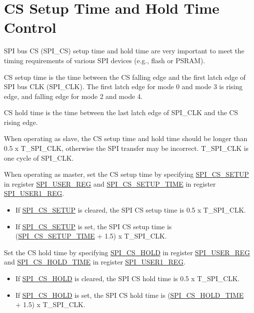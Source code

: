 \documentclass[main\_\_EN.tex]{subfiles}
\begin{document}
\section{CS Setup Time and Hold Time Control}\label{sec:gp-spi2-cs-timing}

SPI bus CS (SPI\_CS) setup time and hold time are very important to meet the timing requirements of various SPI devices (e.g., flash or PSRAM).

CS setup time is the time between the CS falling edge and the first latch edge of SPI bus CLK (SPI\_CLK). The first latch edge for mode 0 and mode 3 is rising edge, and falling edge for mode 2 and mode 4.

CS hold time is the time between the last latch edge of SPI\_CLK and the CS rising edge.

When operating as slave, the CS setup time and hold time should be longer than 0.5 x T\_SPI\_CLK, otherwise the SPI transfer may be incorrect. T\_SPI\_CLK is one cycle of SPI\_CLK.

When operating as master, set the CS setup time by specifying \hyperref[fielddesc:SPICSSETUP]{SPI\_CS\_SETUP} in register \hyperref[regdesc:SPIUSERREG]{SPI\_USER\_REG} and \hyperref[fielddesc:SPICSSETUPTIME]{SPI\_CS\_SETUP\_TIME} in register \hyperref[regdesc:SPIUSER1REG]{SPI\_USER1\_REG}.
    \begin{itemize}
        \item If \hyperref[fielddesc:SPICSSETUP]{SPI\_CS\_SETUP} is cleared, the SPI CS setup time is 0.5 x T\_SPI\_CLK.
        \item If \hyperref[fielddesc:SPICSSETUP]{SPI\_CS\_SETUP} is set, the SPI CS setup time is (\hyperref[fielddesc:SPICSSETUPTIME]{SPI\_CS\_SETUP\_TIME} + 1.5) x T\_SPI\_CLK.
    \end{itemize}

Set the CS hold time by specifying \hyperref[fielddesc:SPICSHOLD]{SPI\_CS\_HOLD} in register \hyperref[regdesc:SPIUSERREG]{SPI\_USER\_REG} and \hyperref[fielddesc:SPICSHOLDTIME]{SPI\_CS\_HOLD\_TIME} in register \hyperref[regdesc:SPIUSER1REG]{SPI\_USER1\_REG}.
    \begin{itemize}
        \item If \hyperref[fielddesc:SPICSHOLD]{SPI\_CS\_HOLD} is cleared, the SPI CS hold time is 0.5 x T\_SPI\_CLK.
        \item If \hyperref[fielddesc:SPICSHOLD]{SPI\_CS\_HOLD} is set, the SPI CS hold time is (\hyperref[fielddesc:SPICSHOLDTIME]{SPI\_CS\_HOLD\_TIME} + 1.5) x T\_SPI\_CLK.
    \end{itemize}
\end{document}
